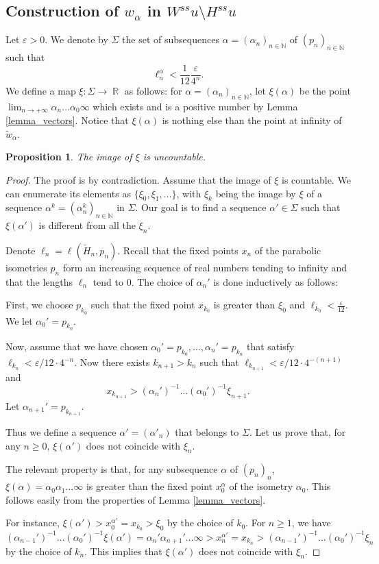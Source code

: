 \documentclass[a4paper,english,reqno]{amsart}
\DeclareMathOperator{\reals}{\mathbb{R}}
\newcommand{\N}{\mathbb{N}} %
\newtheorem{proposition}{Proposition}
\theoremstyle{definition}
\numberwithin{equation}{section}
\begin{document}
\subsection{Construction of $w_\alpha$ in $W^{ss} u \setminus H^{ss} u$}

Let $\varepsilon>0$. 
We denote by $\Sigma$ the set of subsequences $\alpha = (\alpha_n)_{n\in \N}$ of $(p_n)_{n\in \N}$ such that \[\ell_n^\alpha < \frac{1}{12}\frac{\varepsilon}{4^n}.\]
We define a map $\xi : \Sigma \to \reals$ as follows: for $\alpha = (\alpha_n)_{n\in \N}$, let $\xi(\alpha)$ be the point $\lim_{n\to +\infty} \alpha_n \dots \alpha_0 \infty$ which exists and is a positive number by Lemma \ref{lemma_vectors}. Notice that $\xi(\alpha)$ is nothing else than the point at infinity of $\tilde w_{\alpha}$.

\begin{proposition}
	The image of $\xi$ is uncountable.
\end{proposition}
\begin{proof}
	The proof is by contradiction. Assume that the image of $\xi$ is countable. We can enumerate its elements as $\{\xi_0 , \xi_1, \dots \}$, with $\xi_k$ being the image by $\xi$ of a sequence $\alpha^k = (\alpha^k_n )_{n\in \N}$ in $\Sigma$. Our goal is to find a sequence $\alpha' \in \Sigma$ such that $\xi(\alpha')$ is different from all the $\xi_n$.
	
	Denote $\ell_n= \ell (\tilde H_n,p_n)$. Recall that the fixed points $x_n$ of the parabolic isometries $p_n$ form an increasing sequence of real numbers tending to infinity and that the lengths $\ell_n$ tend to $0$. The choice of $\alpha_n'$ is done inductively as follows:
	
	First, we choose $p_{k_0}$ such that the fixed point $x_{k_0}$ is greater than $\xi_0$ and $ \ell_{k_0} < \frac{\varepsilon}{12}$. We let $\alpha_0'= p_{k_0}$.
	
	Now, assume that we have chosen $\alpha_0'= p_{k_0},\dots , \alpha_n'= p_{k_n}$ that satisfy $\ell_{k_n} < \varepsilon/12 \cdot 4^{-n}$. Now there exists ${k_{n+1}}> k_n$ such that $\ell_{k_{n+1}} < \varepsilon/12 \cdot 4^{-(n+1)}$ and \[
	x_{k_{n+1}} > (\alpha_n')^{-1} \dots (\alpha_0')^{-1} \xi_{n+1}.
	\]
	Let $\alpha_{n+1}' = p_{k_{n+1}}$.
	
	Thus we define a sequence $\alpha' = (\alpha'_n)$ that belongs to $\Sigma$.	
	Let us prove that, for any $n\ge 0$, $\xi(\alpha')$ does not coincide with $\xi_n$. 
	
		The relevant property is that, for any subsequence $\alpha$ of $(p_n)_n$, $\xi(\alpha)= \alpha_0 \alpha_1 \dots \infty$ is greater than the fixed point $x_0^{\alpha}$ of the isometry $\alpha_0$. This follows easily from the properties of Lemma \ref{lemma_vectors}. 
		
	For instance, $\xi (\alpha') > x_0^{\alpha'} = x_{k_0} >\xi_0$ by the choice of $k_0$.
	For $n\ge 1$, we have
	\[
	(\alpha_{n-1}')^{-1} \dots (\alpha_0')^{-1} \xi (\alpha ') = \alpha_n' \alpha_{n+1}' \dots \infty > x_n^{\alpha'} = x_{k_n} > (\alpha_{n-1}')^{-1} \dots (\alpha_0')^{-1} \xi_{n}
	\]
	by the choice of $k_n$. This implies that $\xi (\alpha' ) $ does not coincide with $\xi_n$.
	
\end{proof}
\end{document}
